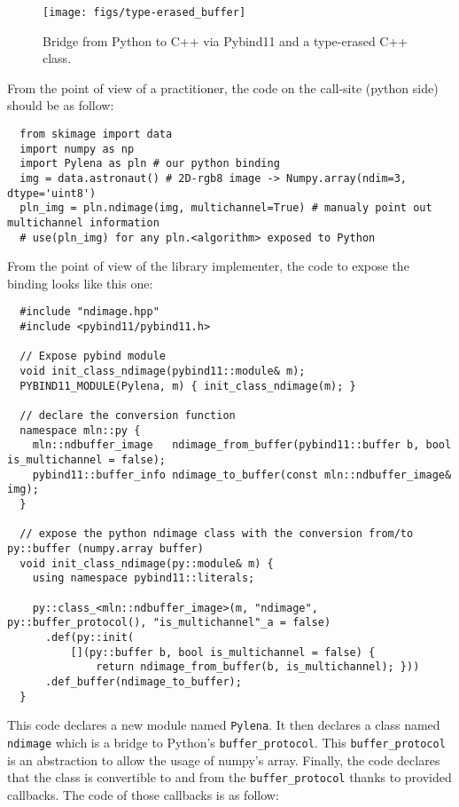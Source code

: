 \begin{figure}[tbh]
  \centering
  \texttt{[image: figs/type-erased\_buffer]}
  \caption{Bridge from Python to C++ via Pybind11 and a type-erased C++ class.}
  \label{fig:type-erased.buffer}
\end{figure}

From the point of view of a practitioner, the code on the call-site (python side) should be as follow:
\begin{verbatim}
  from skimage import data
  import numpy as np
  import Pylena as pln # our python binding
  img = data.astronaut() # 2D-rgb8 image -> Numpy.array(ndim=3, dtype='uint8')
  pln_img = pln.ndimage(img, multichannel=True) # manualy point out multichannel information
  # use(pln_img) for any pln.<algorithm> exposed to Python
\end{verbatim}

From the point of view of the library implementer, the code to expose the binding looks like this one:
\begin{verbatim}
  #include "ndimage.hpp"
  #include <pybind11/pybind11.h>

  // Expose pybind module
  void init_class_ndimage(pybind11::module& m);
  PYBIND11_MODULE(Pylena, m) { init_class_ndimage(m); }

  // declare the conversion function
  namespace mln::py {
    mln::ndbuffer_image   ndimage_from_buffer(pybind11::buffer b, bool is_multichannel = false);
    pybind11::buffer_info ndimage_to_buffer(const mln::ndbuffer_image& img);
  }

  // expose the python ndimage class with the conversion from/to py::buffer (numpy.array buffer)
  void init_class_ndimage(py::module& m) {
    using namespace pybind11::literals;

    py::class_<mln::ndbuffer_image>(m, "ndimage", py::buffer_protocol(), "is_multichannel"_a = false)
      .def(py::init(
          [](py::buffer b, bool is_multichannel = false) {
              return ndimage_from_buffer(b, is_multichannel); }))
      .def_buffer(ndimage_to_buffer);
  }
\end{verbatim}

This code declares a new module named \texttt{Pylena}. It then declares a class named \texttt{ndimage} which is a bridge
to Python's \texttt{buffer\_protocol}. This \texttt{buffer\_protocol} is an abstraction to allow the usage of numpy's
array. Finally, the code declares that the class is convertible to and from the \texttt{buffer\_protocol} thanks to
provided callbacks. The code of those callbacks is as follow:

